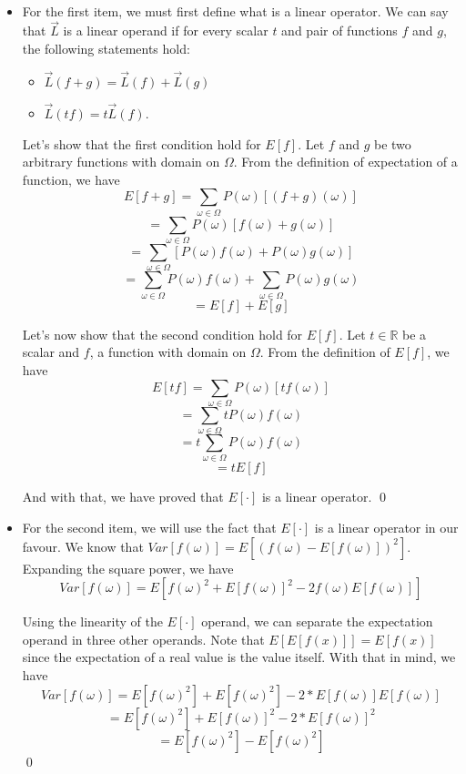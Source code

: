 \documentclass[11pt]{article}
\newenvironment{SL}[1][Solution]{\begin{trivlist}
\item[{\color{blue} \hskip \labelsep {\bfseries #1:}}]}{\end{trivlist}}
\begin{document}
\begin{SL}\
 \begin{itemize}
  \item For the first item, we must first define what is a linear operator. We can say that $\overrightarrow{L}$ is a linear operand if for every scalar $t$ and pair of functions $f$ and $g$, the following statements hold:
  \begin{itemize}
   \item $\overrightarrow{L}(f + g) = \overrightarrow{L}(f) + \overrightarrow{L}(g)$
   \item $\overrightarrow{L}(tf) = t\overrightarrow{L}(f)$.
  \end{itemize}
  
  Let's show that the first condition hold for $E[f]$. Let $f$ and $g$ be two arbitrary functions with domain on $\Omega$. From the definition of expectation of a function, we have $$E[f + g] = \sum\limits_{\omega \in \Omega} P(\omega)[(f + g)(\omega)] $$ $$= \sum\limits_{\omega \in \Omega} P(\omega)[f(\omega) + g(\omega)]$$ $$= \sum\limits_{\omega \in \Omega} [P(\omega)f(\omega) + P(\omega)g(\omega)]$$ $$= \sum\limits_{\omega \in \Omega}P(\omega)f(\omega) + \sum\limits_{\omega \in \Omega}P(\omega)g(\omega)$$ $$= E[f] + E[g]$$
  
  Let's now show that the second condition hold for $E[f]$. Let $t \in \mathbb{R}$ be a scalar and $f$, a function with domain on $\Omega$. From the definition of $E[f]$, we have $$E[tf] = \sum\limits_{\omega \in \Omega} P(\omega)[tf(\omega)]$$ $$= \sum\limits_{\omega \in \Omega} tP(\omega)f(\omega)$$ $$= t\sum\limits_{\omega \in \Omega} P(\omega)f(\omega)$$ $$= tE[f]$$
  
  And with that, we have proved that $E[\cdot]$ is a linear operator. \qed
  
  \item For the second item, we will use the fact that $E[\cdot]$ is a linear operator in our favour. We know that $Var[f(\omega)] = E[(f(\omega) - E[f(\omega)])^2]$. Expanding the square power, we have $$Var[f(\omega)] = E[f(\omega)^2 + E[f(\omega)]^2 - 2f(\omega)E[f(\omega)]]$$
  
  Using the linearity of the $E[\cdot]$ operand, we can separate the expectation operand in three other operands. Note that $E[E[f(x)]] = E[f(x)]$ since the expectation of a real value is the value itself. With that in mind, we have $$Var[f(\omega)] = E[f(\omega)^2] + E[f(\omega)^2] - 2*E[f(\omega)]E[f(\omega)]$$ $$= E[f(\omega)^2] + E[f(\omega)]^2 - 2*E[f(\omega)]^2$$ $$= E[f(\omega)^2] - E[f(\omega)^2]$$ \qed
  \end{itemize}
\end{SL}
\end{document}
